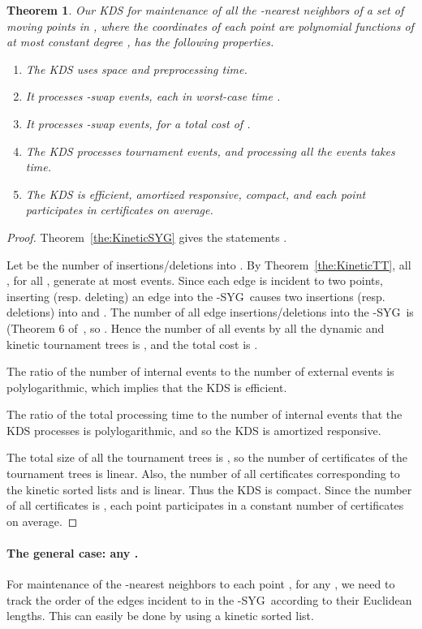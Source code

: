 \documentclass[preprint,12pt]{elsarticle}
\def\ksyg{\mbox{-SYG}}
\def\1syg{\mbox{-SYG}}
\newtheorem{theorem}{Theorem}[section]
\begin{document}
\begin{theorem}\label{the:KineticAllNN}
Our KDS for maintenance of all the -nearest neighbors of a set of  moving points in , where the coordinates of each point are polynomial functions of at most constant degree , has the following properties. 
\begin{enumerate}
\item The KDS uses  space and  preprocessing time.
\item It processes  -swap events, each in worst-case time .
\item It processes  -swap events, for a total cost of .
\item The KDS processes  tournament events, and processing all the events takes  time.
\item The KDS is efficient, amortized responsive, compact, and each point participates in  certificates on average.
\end{enumerate}
\end{theorem}
\begin{proof}
Theorem~\ref{the:KineticSYG} gives the statements . 

Let   be the number of insertions/deletions into . By Theorem~\ref{the:KineticTT}, all , for all , generate at most  events. Since each edge is incident to two points, inserting (resp. deleting) an edge  into the \1syg~causes two insertions (resp. deletions) into  and . The number of all edge insertions/deletions into the \1syg~is  (Theorem 6 of~\cite{Rahmati2014}, so  . Hence the number of all events by all the dynamic and kinetic tournament trees is , and the total cost is . 

The ratio of the number of internal events  to the number of external events  is polylogarithmic, which implies that the KDS is efficient. 

The ratio of the total processing time to the number of internal events that the KDS processes is polylogarithmic, and so the KDS is amortized responsive.

The total size of all the tournament trees is , so the number of certificates of the tournament trees is linear. Also, the number of all certificates corresponding to the kinetic sorted lists  and  is linear. Thus the KDS is compact.  Since the number of all certificates is , each point participates in a constant number of certificates  on average.
\end{proof}


\paragraph{The general case: any .}\label{sec:KDSforkNNs}
For maintenance of the -nearest neighbors to each point , for any , we need to track the order of the edges incident to  in the \ksyg~according to their Euclidean lengths. This can easily be done by using a kinetic sorted list. 
\end{document}

